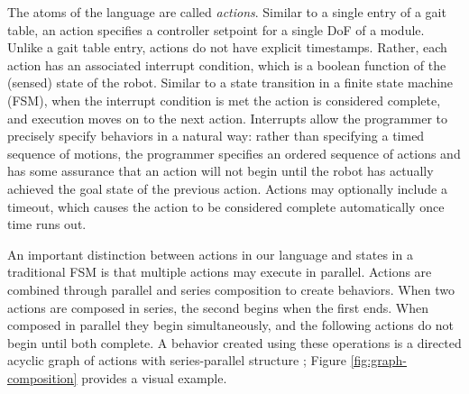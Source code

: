 \documentclass[graybox]{svmult}
\begin{document}
%    

 The atoms of the language are called \textit{actions}.  Similar to a single entry of a gait
table, an action specifies a controller setpoint for a single DoF of a module.  Unlike
a gait table entry, actions do not have explicit timestamps.  Rather, each action has an associated
interrupt condition, which is a boolean function of the (sensed) state of the robot. Similar
to a state transition in a finite state machine (FSM), when the interrupt condition is met the action is  considered
complete, and  execution moves on to the next action.  Interrupts allow the programmer
to precisely specify behaviors in a natural way: rather than specifying a timed sequence
of motions, the programmer specifies an ordered sequence of actions and has some
assurance that an action will not begin until the robot has actually achieved the goal
state of the previous action. Actions
may optionally include a timeout, which causes the action to be considered complete
automatically once time runs out.

An important distinction between actions in our language and states in a traditional
FSM is that multiple actions may execute in parallel.   Actions are combined through
parallel and series composition to create behaviors. When two actions are composed in series,
the second begins when the first ends. When composed in parallel they
begin simultaneously, and the following actions do not begin until both complete.
A behavior created using these operations is a directed acyclic graph of actions with
series-parallel structure \cite{valdes1979recognition};  Figure \ref{fig:graph-composition} provides
a visual example.
 
\end{document}

